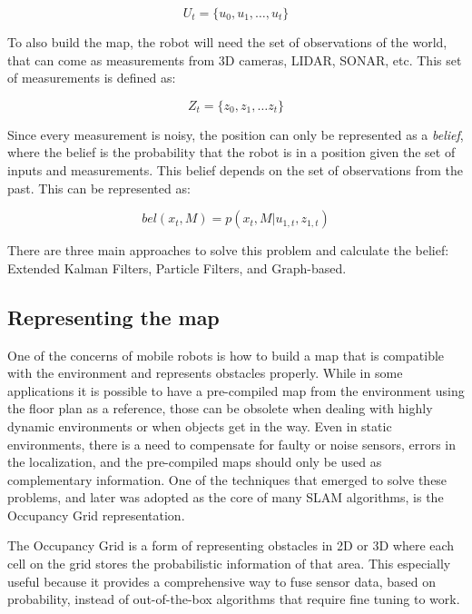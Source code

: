 \begin{equation}
    U_t = \{u_0, u_1, \dots, u_t\}
\end{equation}

To also build the map, the robot will need the set of observations of the world, that can come as measurements from 3D cameras, LIDAR, SONAR, etc. This set of measurements is defined as:

\begin{equation}
    Z_t = \{z_0, z_1, \dots z_t\}
\end{equation}

Since every measurement is noisy, the position can only be represented as a \textit{belief}, where the belief is the probability that the robot is in a position given the set of inputs and measurements. This belief depends on the set of observations from the past. This can be represented as:

\begin{equation}
    bel(x_t, M) = p(x_t, M | u_{1, t}, z_{1,t})
\end{equation}

There are three main approaches to solve this problem and calculate the belief: Extended Kalman Filters, Particle Filters, and Graph-based.

\subsection{Representing the map}

One of the concerns of mobile robots is how to build a map that is compatible with the environment and represents obstacles properly. While in some applications it is possible to have a pre-compiled map from the environment using the floor plan as a reference, those can be obsolete when dealing with highly dynamic environments or when objects get in the way. Even in static environments, there is a need to compensate for faulty or noise sensors, errors in the localization, and the pre-compiled maps should only be used as complementary information. One of the techniques that emerged to solve these problems, and later was adopted as the core of many SLAM algorithms, is the Occupancy Grid \cite{elfes1989using} representation.

The Occupancy Grid is a form of representing obstacles in 2D or 3D where each cell on the grid stores the probabilistic information of that area. This especially useful because it provides a comprehensive way to fuse sensor data, based on probability, instead of out-of-the-box algorithms that require fine tuning to work.

